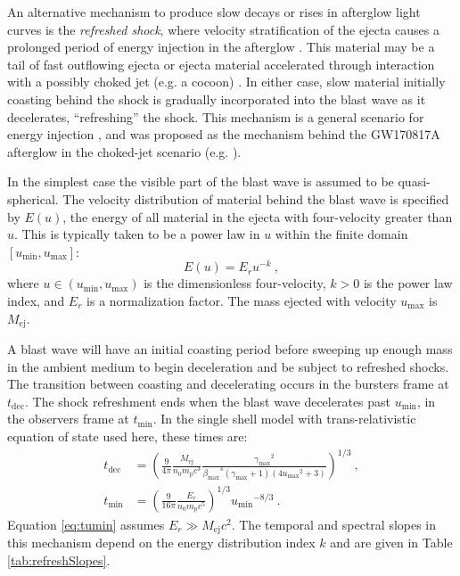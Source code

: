 \documentclass[twocolumn]{aastex62}
\newcommand{\gwbns}{GW170817A}
\newcommand{\Mej}{\ensuremath{M_{\mathrm{ej}}}}
\newcommand{\tdec}{\ensuremath{t_{\mathrm{dec}}}}
\newcommand{\tumin}{\ensuremath{t_{\mathrm{min}}}}
\newcommand{\Mp}{\ensuremath{m_{\mathrm{p}}}}
\newcommand{\umin}{\ensuremath{u_{\mathrm{min}}}}
\newcommand{\umax}{\ensuremath{u_{\mathrm{max}}}}
\newcommand{\gmax}{\ensuremath{\gamma_{\mathrm{max}}}}
\newcommand{\bmax}{\ensuremath{\beta_{\mathrm{max}}}}
\begin{document}
An alternative mechanism to produce slow decays or rises in afterglow light curves is the \emph{refreshed shock}, where velocity stratification of the ejecta causes a prolonged period of energy injection in the afterglow \citep{Rees:1998aa, Panaitescu:1998aa, Sari:2000aa}.  This material may be a tail of fast outflowing ejecta or ejecta material accelerated through interaction with a possibly choked jet (e.g. a cocoon) \citep{Nakar:2011aa, Hotokezaka:2015aa}.  In either case, slow material initially coasting behind the shock is gradually incorporated into the blast wave as it decelerates, ``refreshing'' the shock.  This mechanism is a general scenario for energy injection \citep{Zhang:2006aa}, and was proposed as the mechanism behind the \gwbns{} afterglow in the choked-jet scenario (e.g. \citep{Mooley:2018aa, Nakar:2018aa}).

In the simplest case the visible part of the blast wave is assumed to be quasi-spherical.  The velocity distribution of material behind the blast wave is specified by $E(u)$, the energy of all material in the ejecta with four-velocity greater than $u$.  This is typically taken to be a power law in $u$ within the finite domain $[\umin, \umax]$:
\begin{equation}
	E(u) = E_r u^{-k}\ , \label{eq:Eu}
\end{equation}
where $u \in (\umin, \umax)$ is the dimensionless four-velocity, $k>0$ is the power law index, and $E_r$ is a normalization factor.  The mass ejected with velocity $\umax$ is $\Mej$.

%
%


A blast wave will have an initial coasting period before sweeping up enough mass in the ambient medium to begin deceleration and be subject to refreshed shocks.  The transition between coasting and decelerating occurs in the bursters frame at $\tdec$. The shock refreshment ends when the blast wave decelerates past $\umin$, in the observers frame at $\tumin$.  In the single shell model with trans-relativistic equation of state used here, these times are:
\begin{align}
	\tdec &= \left(\frac{9}{4\pi} \frac{\Mej}{n_0 \Mp c^3} \frac{\gmax^2}{\bmax^3(\gmax+1)(4\umax^2+3)} \right)^{1/3}  \ ,\label{eq:tdec} \\
	\tumin &= \left(\frac{9}{16\pi} \frac{E_r}{n_0 \Mp c^5}\right)^{1/3} \umin^{-8/3} \ .\label{eq:tumin}
\end{align}
Equation \eqref{eq:tumin} assumes $E_r \gg \Mej c^2$.   The temporal and spectral slopes in this mechanism depend on the energy distribution index $k$ and are given in Table \ref{tab:refreshSlopes}.  
\end{document}
